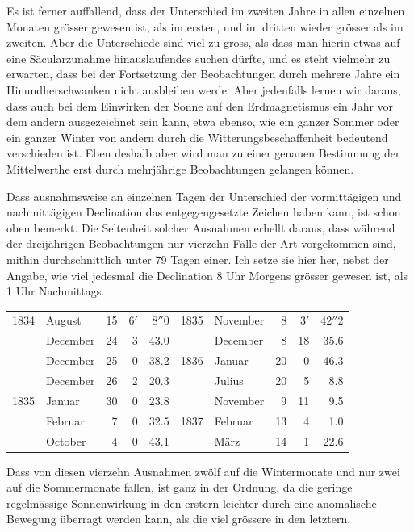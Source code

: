 Es ist ferner auffallend, dass der Unterschied im zweiten Jahre in allen einzelnen Monaten grösser gewesen ist, als im ersten, und im dritten wieder grösser als im zweiten. Aber die Unterschiede sind viel zu gross, als dass man hierin etwas auf eine Säcularzunahme hinauslaufendes suchen dürfte, und es steht vielmehr zu erwarten, dass bei der Fortsetzung der Beobachtungen durch mehrere Jahre ein Hinundherschwanken nicht ausbleiben werde. Aber jedenfalls lernen wir daraus, dass auch bei dem Einwirken der Sonne auf den Erdmagnetismus ein Jahr vor dem andern ausgezeichnet sein kann, etwa ebenso, wie ein ganzer Sommer oder ein ganzer Winter von andern durch die Witterungsbeschaffenheit bedeutend verschieden ist. Eben deshalb aber wird man zu einer genauen Bestimmung der Mittelwerthe erst durch mehrjährige Beobachtungen gelangen können.

Dass ausnahmsweise an einzelnen Tagen der Unterschied der vormittägigen und nachmittägigen Declination das entgegengesetzte Zeichen haben kann, ist schon oben bemerkt. Die Seltenheit solcher Ausnahmen erhellt daraus, dass während der dreijährigen Beobachtungen nur vierzehn Fälle der Art vorgekommen sind, mithin durchschnittlich unter 79 Tagen einer. Ich setze sie hier her, nebst der Angabe, wie viel jedesmal die Declination 8 Uhr Morgens grösser gewesen ist, als 1 Uhr Nachmittags.
\begin{center}\small
\begin{tabular}{rlr|rr||rlr|rr}
1834&August&15&$6'$&$8''0$&1835&November&8&$3'$&$42''2$\\
&December&24&3&43.0&&December&8&18&35.6\\
&December&25&0&38.2&1836&Januar&20&0&46.3\\
&December&26&2&20.3&&Julius&20&5&8.8\\
1835&Januar&30&0&23.8&&November&9&11&9.5\\
&Februar&7&0&32.5&1837&Februar&13&4&1.0\\
&October&4&0&43.1&&März&14&1&22.6
\end{tabular}
\end{center}
Dass von diesen vierzehn Ausnahmen zwölf auf die Wintermonate und nur zwei auf die Sommermonate fallen, ist ganz in der Ordnung, da die geringe regelmässige Sonnenwirkung in den erstern leichter durch eine anomalische Bewegung überragt werden kann, als die viel grössere in den letztern.

